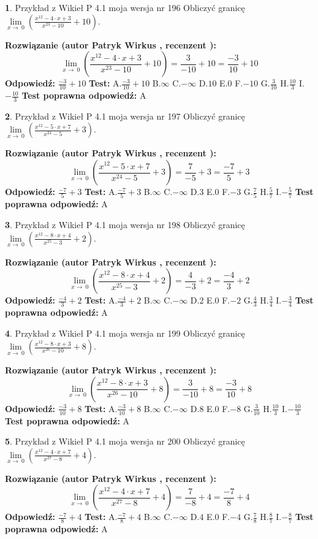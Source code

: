 \documentclass[12pt, a4paper]{article}
\theoremstyle{definition} %
\newtheorem{zad}{}
\newcommand{\zadStart}[1]{\begin{zad}#1\newline}
\newcommand{\zadStop}{\end{zad}}
\newcommand{\rozwStart}[2]{\noindent \textbf{Rozwiązanie (autor #1 , recenzent #2): }\newline}
\newcommand{\rozwStop}{\newline}
\newcommand{\odpStart}{\noindent \textbf{Odpowiedź:}\newline}
\newcommand{\odpStop}{\newline}
\newcommand{\testStart}{\noindent \textbf{Test:}\newline}
\newcommand{\testStop}{\newline}
\newcommand{\kluczStart}{\noindent \textbf{Test poprawna odpowiedź:}\newline}
\newcommand{\kluczStop}{\newline}
\begin{document}
\zadStart{Przykład z Wikieł P 4.1 moja wersja nr 196}
Obliczyć granicę $\lim\limits_{x\to\ 0}(\frac{x^{12}-4 \cdot x +3}{x^{23}-10}+10)$.
\zadStop
\rozwStart{Patryk Wirkus}{}
$$\lim\limits_{x\to\ 0}(\frac{x^{12}-4 \cdot x +3}{x^{23}-10}+10)=\frac{3}{-10}+10=\frac{-3}{10}+10$$
\rozwStop
\odpStart
$\frac{-3}{10}+10$
\odpStop
\testStart
A.$\frac{-3}{10}+10$
B.$\infty$
C.$-\infty$
D.$10$
E.$0$
F.$-10$
G.$\frac{3}{10}$
H.$\frac{10}{3}$
I.$-\frac{10}{3}$
\testStop
\kluczStart
A
\kluczStop



\zadStart{Przykład z Wikieł P 4.1 moja wersja nr 197}
Obliczyć granicę $\lim\limits_{x\to\ 0}(\frac{x^{12}-5 \cdot x +7}{x^{24}-5}+3)$.
\zadStop
\rozwStart{Patryk Wirkus}{}
$$\lim\limits_{x\to\ 0}(\frac{x^{12}-5 \cdot x +7}{x^{24}-5}+3)=\frac{7}{-5}+3=\frac{-7}{5}+3$$
\rozwStop
\odpStart
$\frac{-7}{5}+3$
\odpStop
\testStart
A.$\frac{-7}{5}+3$
B.$\infty$
C.$-\infty$
D.$3$
E.$0$
F.$-3$
G.$\frac{7}{5}$
H.$\frac{5}{7}$
I.$-\frac{5}{7}$
\testStop
\kluczStart
A
\kluczStop



\zadStart{Przykład z Wikieł P 4.1 moja wersja nr 198}
Obliczyć granicę $\lim\limits_{x\to\ 0}(\frac{x^{12}-8 \cdot x +4}{x^{25}-3}+2)$.
\zadStop
\rozwStart{Patryk Wirkus}{}
$$\lim\limits_{x\to\ 0}(\frac{x^{12}-8 \cdot x +4}{x^{25}-3}+2)=\frac{4}{-3}+2=\frac{-4}{3}+2$$
\rozwStop
\odpStart
$\frac{-4}{3}+2$
\odpStop
\testStart
A.$\frac{-4}{3}+2$
B.$\infty$
C.$-\infty$
D.$2$
E.$0$
F.$-2$
G.$\frac{4}{3}$
H.$\frac{3}{4}$
I.$-\frac{3}{4}$
\testStop
\kluczStart
A
\kluczStop



\zadStart{Przykład z Wikieł P 4.1 moja wersja nr 199}
Obliczyć granicę $\lim\limits_{x\to\ 0}(\frac{x^{12}-8 \cdot x +3}{x^{26}-10}+8)$.
\zadStop
\rozwStart{Patryk Wirkus}{}
$$\lim\limits_{x\to\ 0}(\frac{x^{12}-8 \cdot x +3}{x^{26}-10}+8)=\frac{3}{-10}+8=\frac{-3}{10}+8$$
\rozwStop
\odpStart
$\frac{-3}{10}+8$
\odpStop
\testStart
A.$\frac{-3}{10}+8$
B.$\infty$
C.$-\infty$
D.$8$
E.$0$
F.$-8$
G.$\frac{3}{10}$
H.$\frac{10}{3}$
I.$-\frac{10}{3}$
\testStop
\kluczStart
A
\kluczStop



\zadStart{Przykład z Wikieł P 4.1 moja wersja nr 200}
Obliczyć granicę $\lim\limits_{x\to\ 0}(\frac{x^{12}-4 \cdot x +7}{x^{27}-8}+4)$.
\zadStop
\rozwStart{Patryk Wirkus}{}
$$\lim\limits_{x\to\ 0}(\frac{x^{12}-4 \cdot x +7}{x^{27}-8}+4)=\frac{7}{-8}+4=\frac{-7}{8}+4$$
\rozwStop
\odpStart
$\frac{-7}{8}+4$
\odpStop
\testStart
A.$\frac{-7}{8}+4$
B.$\infty$
C.$-\infty$
D.$4$
E.$0$
F.$-4$
G.$\frac{7}{8}$
H.$\frac{8}{7}$
I.$-\frac{8}{7}$
\testStop
\kluczStart
A
\kluczStop
\end{document}
